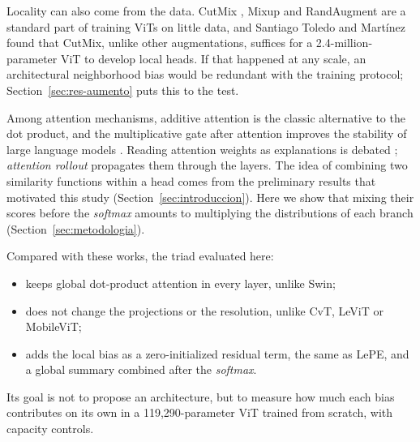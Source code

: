 Locality can also come from the data. CutMix \cite{yun2019cutmix}, Mixup \cite{zhang2018mixup} and RandAugment \cite{cubuk2020randaugment} are a standard part of training ViTs on little data, and Santiago Toledo and Martínez \cite{santiago2026inducing} found that CutMix, unlike other augmentations, suffices for a 2.4-million-parameter ViT to develop local heads. If that happened at any scale, an architectural neighborhood bias would be redundant with the training protocol; Section~\ref{sec:res-aumento} puts this to the test.

Among attention mechanisms, additive attention \cite{bahdanau2015neural} is the classic alternative to the dot product, and the multiplicative gate after attention improves the stability of large language models \cite{qiu2025gated}. Reading attention weights as explanations is debated \cite{jain2019attention}; \emph{attention rollout} \cite{abnar2020quantifying} propagates them through the layers. The idea of combining two similarity functions within a head comes from the preliminary results that motivated this study (Section~\ref{sec:introduccion}). Here we show that mixing their scores before the \emph{softmax} amounts to multiplying the distributions of each branch (Section~\ref{sec:metodologia}).

Compared with these works, the triad evaluated here:
\begin{itemize}
  \item keeps global dot-product attention in every layer, unlike Swin;
  \item does not change the projections or the resolution, unlike CvT, LeViT or MobileViT;
  \item adds the local bias as a zero-initialized residual term, the same as LePE, and a global summary combined after the \emph{softmax}.
\end{itemize}
Its goal is not to propose an architecture, but to measure how much each bias contributes on its own in a 119,290-parameter ViT trained from scratch, with capacity controls.

